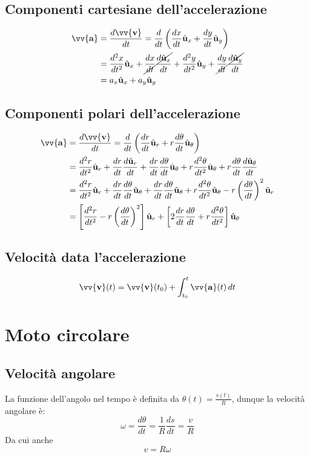 \documentclass{report}
\newcommand{\versore}[1]{\hat{\mathbf{u}}_{#1}}
\newcommand{\ux}{\versore{x}}
\newcommand{\uy}{\versore{y}}
\newcommand{\ur}{\versore{r}}
\newcommand{\uth}{\versore{\theta}}
\newcommand{\vett}[1]{\vv{\boldsymbol{\mathbf{#1}}}}
\begin{document}
\subsection{Componenti cartesiane dell'accelerazione}
\begin{align*}
    \vett{a} & = \frac{d\vett{v}}{dt} 
    = \frac{d}{dt}\left(\frac{dx}{dt}\ux + \frac{dy}{dt}\uy\right) \\
    & = \frac{d^2 x}{dt^2}\ux + \cancel{\frac{dx}{dt}\frac{d\ux}{dt}}
    + \frac{d^2 y}{dt^2}\uy + \cancel{\frac{dy}{dt}\frac{d\uy}{dt}} \\
    & = a_x\ux + a_y\uy
\end{align*}

\subsection{Componenti polari dell'accelerazione}
\begin{align}
    \vett{a} & = \frac{d\vett{v}}{dt} 
    = \frac{d}{dt}\left(\frac{dr}{dt}\ur + r\frac{d\theta}{dt}\uth\right) \nonumber \\
    & = \frac{d^2 r}{dt^2}\ur + \frac{dr}{dt}\frac{d\ur}{dt} 
    + \frac{dr}{dt}\frac{d\theta}{dt}\uth + r\frac{d^2 \theta}{dt^2}\uth
    + r\frac{d\theta}{dt}\frac{d\uth}{dt} \nonumber \\
    & = \frac{d^2 r}{dt^2}\ur + \frac{dr}{dt}\frac{d\theta}{dt}\uth 
    + \frac{dr}{dt}\frac{d\theta}{dt}\uth + r\frac{d^2 \theta}{dt^2}\uth
    - r\left(\frac{d\theta}{dt}\right)^2\ur \nonumber \\
    & = \left[\frac{d^2 r}{dt^2} - r\left(\frac{d\theta}{dt}\right)^2\right]\ur
    + \left[2\frac{dr}{dt}\frac{d\theta}{dt} + r\frac{d^2 \theta}{dt^2}\right]\uth
\end{align}

\subsection{Velocità data l'accelerazione}
\begin{equation}
    \vett{v}(t) = \vett{v}(t_0) + \int_{t_0}^{t}\vett{a}(t)\,dt
\end{equation}

\section{Moto circolare}
\subsection{Velocità angolare}
La funzione dell'angolo nel tempo è definita da \(\theta(t) = \frac{s(t)}{R}\), dunque la velocità angolare è:
\begin{equation}
    \omega = \frac{d\theta}{dt} = \frac{1}{R}\frac{ds}{dt} = \frac{v}{R}
\end{equation}
Da cui anche
\begin{equation*}
    v = R\omega
\end{equation*}
\end{document}

